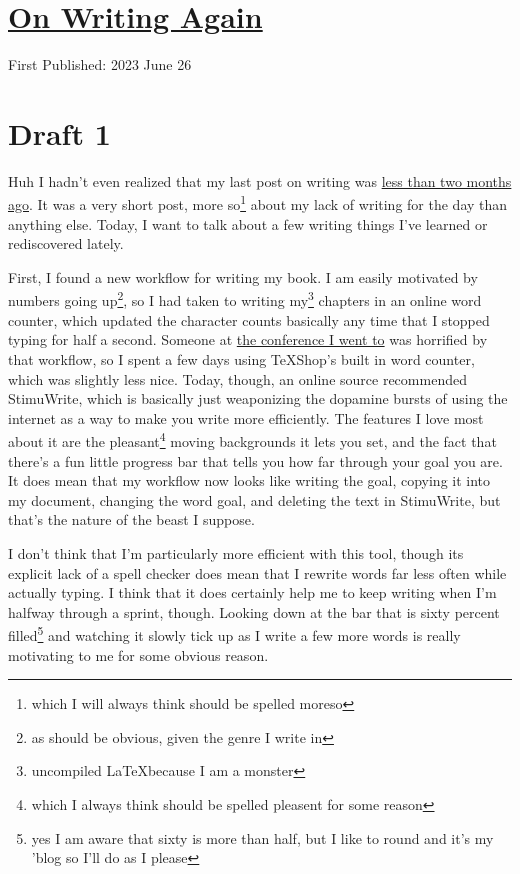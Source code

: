 \documentclass[12pt]{article}[titlepage]
\newcommand{\1}{\={a}}
\newcommand{\2}{\={e}}
\newcommand{\3}{\={\i}}
\newcommand{\4}{\=o}
\newcommand{\5}{\=u}
\newcommand{\6}{\={A}}
\renewcommand{\,}{\textsuperscript{,}}
\begin{document}
\doublespacing
\section{\href{writing-5.html}{On Writing Again}}
First Published: 2023 June 26

\section{Draft 1}
Huh I hadn't even realized that my last post on writing was \href{writing-4.html}{less than two months ago}.
It was a very short post, more so\footnote{which I will always think should be spelled moreso} about my lack of writing for the day than anything else.
Today, I want to talk about a few writing things I've learned or rediscovered lately.

First, I found a new workflow for writing my book.
I am easily motivated by numbers going up\footnote{as should be obvious, given the genre I write in}, so I had taken to writing my\footnote{uncompiled \LaTeX because I am a monster} chapters in an online word counter, which updated the character counts basically any time that I stopped typing for half a second.
Someone at \href{conference.html}{the conference I went to} was horrified by that workflow, so I spent a few days using TeXShop's built in word counter, which was slightly less nice.
Today, though, an online source recommended StimuWrite, which is basically just weaponizing the dopamine bursts of using the internet as a way to make you write more efficiently.
The features I love most about it are the pleasant\footnote{which I always think should be spelled pleasent for some reason} moving backgrounds it lets you set, and the fact that there's a fun little progress bar that tells you how far through your goal you are.
It does mean that my workflow now looks like writing the goal, copying it into my document, changing the word goal, and deleting the text in StimuWrite, but that's the nature of the beast I suppose.

I don't think that I'm particularly more efficient with this tool, though its explicit lack of a spell checker does mean that I rewrite words far less often while actually typing.
I think that it does certainly help me to keep writing when I'm halfway through a sprint, though.
Looking down at the bar that is sixty percent filled\footnote{yes I am aware that sixty is more than half, but I like to round and it's my 'blog so I'll do as I please} and watching it slowly tick up as I write a few more words is really motivating to me for some obvious reason.
\end{document}
